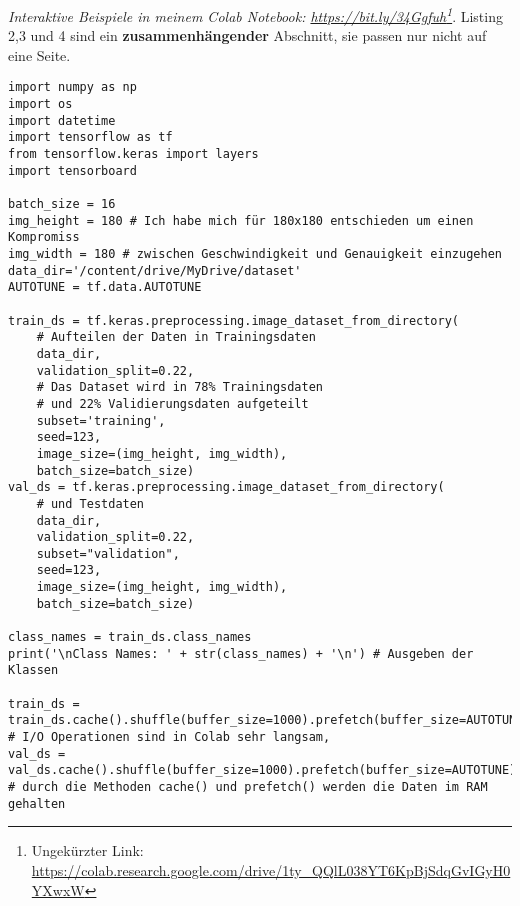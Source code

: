 \emph{Interaktive Beispiele in meinem Colab Notebook: \url{https://bit.ly/34Ggfuh}\footnote{Ungekürzter Link: \url{https://colab.research.google.com/drive/1ty_QQlL038YT6KpBjSdqGvIGyH0YXwxW}}}. Listing 2,3 und 4 sind ein \textbf{zusammenhängender} Abschnitt, sie passen nur nicht auf eine Seite.

\begin{listing}[H]
    \begin{verbatim}
import numpy as np
import os
import datetime
import tensorflow as tf
from tensorflow.keras import layers
import tensorboard

batch_size = 16
img_height = 180 # Ich habe mich für 180x180 entschieden um einen Kompromiss
img_width = 180 # zwischen Geschwindigkeit und Genauigkeit einzugehen
data_dir='/content/drive/MyDrive/dataset'
AUTOTUNE = tf.data.AUTOTUNE

train_ds = tf.keras.preprocessing.image_dataset_from_directory(
    # Aufteilen der Daten in Trainingsdaten
    data_dir,
    validation_split=0.22,
    # Das Dataset wird in 78% Trainingsdaten
    # und 22% Validierungsdaten aufgeteilt
    subset='training',
    seed=123,
    image_size=(img_height, img_width),
    batch_size=batch_size)
val_ds = tf.keras.preprocessing.image_dataset_from_directory(
    # und Testdaten
    data_dir,
    validation_split=0.22,
    subset="validation",
    seed=123,
    image_size=(img_height, img_width),
    batch_size=batch_size)

class_names = train_ds.class_names
print('\nClass Names: ' + str(class_names) + '\n') # Ausgeben der Klassen

train_ds = train_ds.cache().shuffle(buffer_size=1000).prefetch(buffer_size=AUTOTUNE)
# I/O Operationen sind in Colab sehr langsam,
val_ds = val_ds.cache().shuffle(buffer_size=1000).prefetch(buffer_size=AUTOTUNE)
# durch die Methoden cache() und prefetch() werden die Daten im RAM gehalten
    \end{verbatim}
    \caption{Code zum Erstellen und Trainieren des Models aus Labelcheck Teil 1}
\end{listing}

